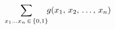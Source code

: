 \documentclass[preview]{standalone}
\begin{document}
\begin{align*}
\special{dvisvgm:raw <g id='unique000'>}\sum_{x_1\ldots x_n\,\in\,\{0,1\}}\!\! g(x_1,\,x_2,\,\ldots,\,x_n)\special{dvisvgm:raw </g>}
\end{align*}
\end{document}
